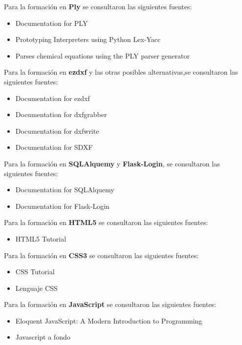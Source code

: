 Para la formación en \textbf{Ply} se consultaron las siguientes fuentes:

\begin{itemize}
\item Documentation for PLY  \cite{HomePly}
\item Prototyping Interpreters using Python Lex-Yacc \cite{Ply2}
\item Parses chemical equations using the PLY parser generator \cite{Ply3}
\end{itemize}

Para la formación en \textbf{ezdxf} y las otras posibles alternativas,se consultaron las siguientes fuentes:

\begin{itemize}
\item Documentation for ezdxf \cite{ezdxf}
\item Documentation for dxfgrabber \cite{dxfgrabber}
\item Documentation for dxfwrite \cite{dxfwrite}
\item Documentation for SDXF \cite{sdxf}
\end{itemize}

Para la formación en \textbf{SQLAlquemy}  y \textbf{Flask-Login}, se consultaron las siguientes fuentes:

\begin{itemize}
\item Documentation for SQLAlquemy \cite{SQLAlquemy}
\item Documentation for Flask-Login \cite{Flasklogin}
\end{itemize}

Para la formación en \textbf{HTML5} se consultaron las siguientes fuentes:

\begin{itemize}
\item HTML5 Tutorial \cite{html5}
\end{itemize}

Para la formación en \textbf{CSS3} se consultaron las siguientes fuentes:

\begin{itemize}
\item CSS Tutorial \cite{css3}
\item Lenguaje CSS \cite{css3_1}
\end{itemize}

Para la formación en \textbf{JavaScript} se consultaron las siguientes fuentes:

\begin{itemize}
\item Eloquent JavaScript: A Modern Introduction to Programming \cite{JavaScript}
\item Javascript a fondo \cite{JavaScript_1}
\end{itemize}

